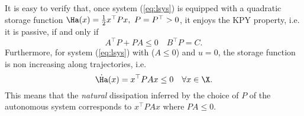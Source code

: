 %
{%
It is easy to verify that, once system (\ref{eq:lsys}) is equipped with a quadratic storage function $\Ha(x) = \frac{1}{2}x^\top Px,~P = P^\top >0$, it enjoys the KPY property, i.e. it is passive, if and only if
%
\begin{equation}\label{eq:KYPLTI}
        A^\top P + PA \leq 0\quad
        B^\top P = C.
\end{equation}
%
%
%
%
Furthermore, for system (\ref{eq:lsys}) with ($A\leq0$) and $u=0$, the storage function is non increasing along trajectories, i.e.
%
\begin{equation*}
    \dot{\Ha}(x)
    =  x^\top PAx \leq 0\quad\forall x\in\X.%
\end{equation*}
%
This means that the \textit{natural} dissipation inferred by the choice of $P$ of the autonomous system corresponds to $x^\top PAx$ where $PA\leq0$. 

}
